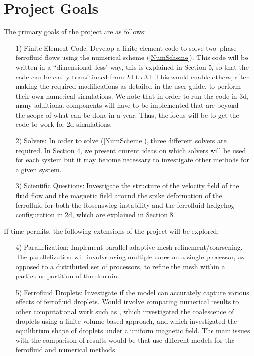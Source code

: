\documentclass[11pt,fullpage]{article}
\theoremstyle{lemma}
\theoremstyle{definition}
\theoremstyle{lemma}
\begin{document}
\section{Project Goals}
The primary goals of the project are as follows:
\begin{itemize}
	\item[1)] Finite Element Code: Develop a finite element code to solve two--phase ferrofluid flows using the numerical scheme (\ref{NumScheme}). This code will be written in a ``dimensional--less" way, this is explained in Section 5, so that the code can be easily transitioned from 2d to 3d. This would enable others, after making the required modifications as detailed in the user guide, to perform their own numerical simulations. We note that in order to run the code in 3d, many additional components will have to be implemented that are beyond the scope of what can be done in a year. Thus, the focus will be to get the code to work for 2d simulations.
	
	\item[2)] Solvers: In order to solve (\ref{NumScheme}), three different solvers are required. In Section 4, we present current ideas on which solvers will be used for each system but it may become necessary to investigate other methods for a given system.
	
	\item[3)] Scientific Questions: Investigate the structure of the velocity field of the fluid flow and the magnetic field around the spike deformation of the ferrofluid for both the Rosenswieg instability and the ferrofluid hedgehog configuration in 2d, which are explained in Section 8.
\end{itemize}
If time permits, the following extensions of the project will be explored:
\begin{itemize}
	\item[4)] Parallelization: Implement parallel adaptive mesh refinement/coarsening. The parallelization will involve using multiple cores on a single processor, as opposed to a distributed set of processors, to refine the mesh within a particular partition of the domain.
	
	\item[5)] Ferrofluid Droplets: Investigate if the model can accurately capture various effects of ferrofluid droplets. Would involve comparing numerical results to other computational work such as \cite{CompDropplet}, which investigated the coalescence of droplets using a finite volume based approach, and \cite{DroppletDeform} which investigated the equilibrium shape of droplets under a uniform magnetic field. The main issues with the comparison of results would be that \cite{CompDropplet, DroppletDeform} use different models for the ferrofluid and numerical methods.
\end{itemize}
\end{document}
